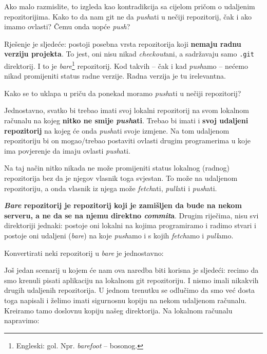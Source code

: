 Ako malo razmislite, to izgleda kao kontradikcija sa cijelom pričom o udaljenim repozitorijima.
Kako to da nam git ne da \emph{push}ati u nečiji repozitorij, čak i ako imamo ovlasti?
Čemu onda uopće \emph{push}?

Rješenje je sljedeće: postoji posebna vrsta repozitorija koji \textbf{nemaju radnu verziju projekta}.
To jest, oni nisu nikad \emph{checkout}ani, a sadržavaju samo \verb+.git+ direktorij.
I to je \emph{bare}\footnote{Engleski: gol. Npr. \emph{barefoot} -- bosonog.} repozitorij.
Kod takvih -- čak i kad \emph{push}amo -- nećemo nikad promijeniti status radne verzije.
Radna verzija je tu irelevantna.

Kako se to uklapa u priču da ponekad moramo \emph{push}ati u nečiji repozitorij?

Jednostavno, svatko bi trebao imati svoj lokalni repozitorij na svom lokalnom računalu na kojeg \textbf{nitko ne smije \emph{push}ati}.
Trebao bi imati i \textbf{svoj udaljeni repozitorij} na kojeg će onda \emph{push}ati svoje izmjene.
Na tom udaljenom repozitoriju bi on mogao/trebao postaviti ovlasti drugim programerima u koje ima povjerenje da imaju ovlasti \emph{push}ati.

Na taj način nitko nikada ne može promijeniti status lokalnog (radnog) repozitorija bez da je njegov vlasnik toga svjestan.
To može na udaljenom repozitoriju, a onda vlasnik iz njega može \emph{fetch}ati, \emph{pull}ati i \emph{push}ati.

\textbf{\emph{Bare} repozitorij je repozitorij koji je zamišljen da bude na nekom serveru, a ne da se na njemu direktno \emph{commit}a}.
Drugim riječima, nisu svi direktoriji jednaki: 
postoje oni lokalni na kojima programiramo i radimo stvari i postoje oni udaljeni (\emph{bare}) na koje \emph{push}amo i s kojih \emph{fetch}amo i \emph{pull}amo.

Konvertirati neki repozitorij u \emph{bare} je jednostavno:


Još jedan scenarij u kojem će nam ova naredba biti korisna je sljedeći: recimo da smo krenuli pisati aplikaciju na lokalnom git repozitoriju.
I nismo imali nikakvih drugih udaljenih repozitorija.
U jednom trenutku se odlučimo da smo već dosta toga napisali i želimo imati sigurnosnu kopiju na nekom udaljenom računalu.
Kreiramo tamo doslovnu kopiju našeg direktorija.
Na lokalnom računalu napravimo:


